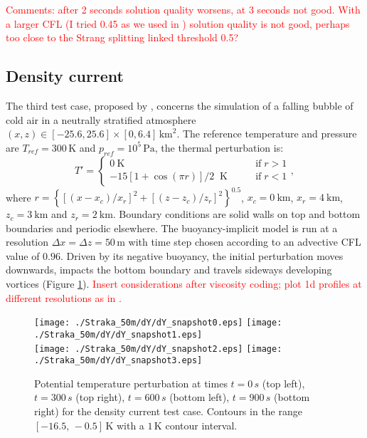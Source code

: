 \documentclass{ametsoc}
\theoremstyle{definition}
\newcommand{\benacchio}[1]{\textcolor{red}{#1}}
\begin{document}
\benacchio{Comments: after 2 seconds solution quality worsens, at 3 seconds not good. With a larger CFL (I tried 0.45 as we used in \cite{BenacchioEtAl2014}) solution quality is not good, perhaps too close to the Strang splitting linked threshold 0.5?}

\subsection{Density current}

The third test case, proposed by \cite{StrakaEtAl1993}, concerns the simulation of a falling bubble of cold air in a neutrally stratified atmosphere $(x,z)\in[-25.6,25.6]\times[0,6.4]\,\textrm{km}^2$. The reference temperature and pressure  are $T_{ref}=300\,\textrm{K}$ and $p_{ref}=10^5\,\textrm{Pa}$, the thermal perturbation is:
%
\begin{equation}
 T'=\begin{cases}
           0~\textrm{K} \qquad&\textrm{if}\;r>1\\
	   -15\left[1+\cos(\pi r)\right]/2 \;\;\textrm{K}\qquad&\textrm{if}\;r<1   
          \end{cases},
\end{equation} 
%
where $r=\left\{[(x-x_c)/x_r]^2+[(z-z_c)/z_r]^2\right\}^{0.5}$, $x_c=0~\textrm{km}$, $x_r=4~\textrm{km}$, $z_c=3~\textrm{km}$ and $z_r=2~\textrm{km}$. 
%
Boundary conditions are solid walls on top and bottom boundaries and periodic elsewhere. The buoyancy-implicit model is run at a resolution $\Delta x=\Delta z=50\,\textrm{m}$ with time step chosen according to an advective CFL value of $0.96$. Driven by its negative buoyancy, the initial perturbation moves downwards, impacts the bottom boundary and travels sideways developing vortices (Figure \ref{fig:straka}). \benacchio{Insert considerations after viscosity coding; plot 1d profiles at different resolutions as in \cite{BenacchioEtAl2014}.}

\begin{figure}
\centering
 \texttt{[image: ./Straka\_50m/dY/dY\_snapshot0.eps]}
 \texttt{[image: ./Straka\_50m/dY/dY\_snapshot1.eps]}\\
 \texttt{[image: ./Straka\_50m/dY/dY\_snapshot2.eps]}
 \texttt{[image: ./Straka\_50m/dY/dY\_snapshot3.eps]}
 \caption{Potential temperature perturbation at times $t=0\, s$ (top left), $t=300\, s$ (top right), $t=600\, s$ (bottom left), $t=900\, s$ (bottom right) for the density current test case. Contours in the range $[-16.5,\,-0.5]\,\textrm{K}$ with a $1\,\textrm{K}$ contour interval.}
 \label{fig:straka}
\end{figure}
\end{document}
